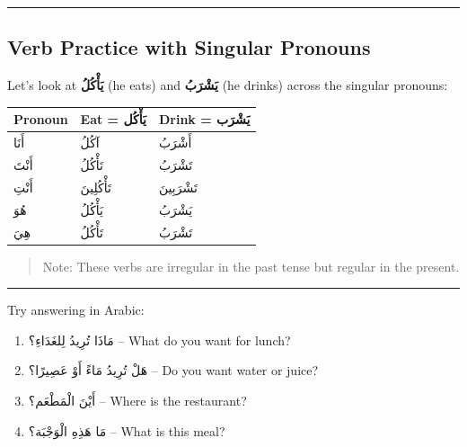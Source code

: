 \documentclass[
  a4paper,
  DIV=11,
  numbers=noendperiod]{scrartcl}
\providecommand{\tightlist}{%
  \setlength{\itemsep}{0pt}\setlength{\parskip}{0pt}}
\begin{document}
\begin{center}\rule{0.5\linewidth}{0.5pt}\end{center}

\subsection{Verb Practice with Singular
Pronouns}\label{verb-practice-with-singular-pronouns}

Let's look at \textbf{يَأْكُلُ} (he eats) and \textbf{يَشْرَبُ} (he drinks)
across the singular pronouns:

\begin{longtable}[]{@{}lll@{}}
\toprule\noalign{}
Pronoun & Eat = يَأْكُل & Drink = يَشْرَب \\
\midrule\noalign{}
\endhead
\bottomrule\noalign{}
\endlastfoot
أَنَا & آكُلُ & أَشْرَبُ \\
أَنْتَ & تَأْكُلُ & تَشْرَبُ \\
أَنْتِ & تَأْكُلِينَ & تَشْرَبِينَ \\
هُوَ & يَأْكُلُ & يَشْرَبُ \\
هِيَ & تَأْكُلُ & تَشْرَبُ \\
\end{longtable}

\begin{quote}
Note: These verbs are irregular in the past tense but regular in the
present.
\end{quote}

\begin{center}\rule{0.5\linewidth}{0.5pt}\end{center}

\begin{tcolorbox}[enhanced jigsaw, bottomrule=.15mm, arc=.35mm, colbacktitle=quarto-callout-note-color!10!white, opacityback=0, toptitle=1mm, title=\textcolor{quarto-callout-note-color}{\faInfo}\hspace{0.5em}{Quick Questions}, colframe=quarto-callout-note-color-frame, opacitybacktitle=0.6, colback=white, coltitle=black, titlerule=0mm, left=2mm, toprule=.15mm, bottomtitle=1mm, rightrule=.15mm, leftrule=.75mm, breakable]

Try answering in Arabic:

\begin{enumerate}
\def\labelenumi{\arabic{enumi}.}
\tightlist
\item
  مَاذَا تُرِيدُ لِلغَدَاءِ؟ -- What do you want for lunch?\\
\item
  هَلْ تُرِيدُ مَاءً أَوْ عَصِيرًا؟ -- Do you want water or juice?\\
\item
  أَيْنَ الْمَطْعَم؟ -- Where is the restaurant?\\
\item
  مَا هَذِهِ الْوَجْبَة؟ -- What is this meal?
\end{enumerate}

\end{tcolorbox}
\end{document}
